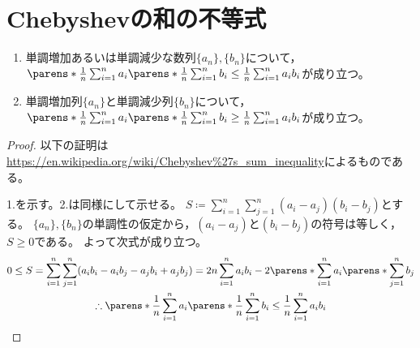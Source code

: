     \section{Chebyshevの和の不等式}
        \label{subsec:Chebyshevの和の不等式}
        \begin{shadebox}
            \begin{enumerate}
                \item 単調増加あるいは単調減少な数列$\{a_n\},\{b_n\}$について，$\parens*{\frac{1}{n}\sum_{i=1}^n a_i}\parens*{\frac{1}{n}\sum_{i=1}^n b_i} \leq \frac{1}{n}\sum_{i=1}^n a_ib_i$が成り立つ。
                \item 単調増加列$\{a_n\}$と単調減少列$\{b_n\}$について，$\parens*{\frac{1}{n}\sum_{i=1}^n a_i}\parens*{\frac{1}{n}\sum_{i=1}^n b_i} \geq \frac{1}{n}\sum_{i=1}^n a_ib_i$が成り立つ。
            \end{enumerate}
        \end{shadebox}
        \begin{proof}
            以下の証明は\url{https://en.wikipedia.org/wiki/Chebyshev%27s_sum_inequality}によるものである。
            \par
            1.を示す。2.は同様にして示せる。
            $S \coloneq \sum_{i=1}^n \sum_{j=1}^n (a_i-a_j)(b_i-b_j)$とする。
            $\{a_n\},\{b_n\}$の単調性の仮定から，$(a_i-a_j)$と$(b_i-b_j)$の符号は等しく，$S\geq 0$である。
            よって次式が成り立つ。
            \begin{gather*}
                0 \leq S = \sum_{i=1}^n \sum_{j=1}^n (a_i b_i - a_i b_j - a_j b_i + a_j b_j) = 2n\sum_{i=1}^n a_i b_i - 2\parens*{\sum_{i=1}^n a_i}\parens*{\sum_{j=1}^n b_j} \\
                \therefore \parens*{\frac{1}{n}\sum_{i=1}^n a_i}\parens*{\frac{1}{n}\sum_{i=1}^n b_i} \leq \frac{1}{n}\sum_{i=1}^n a_ib_i
            \end{gather*}
        \end{proof}
